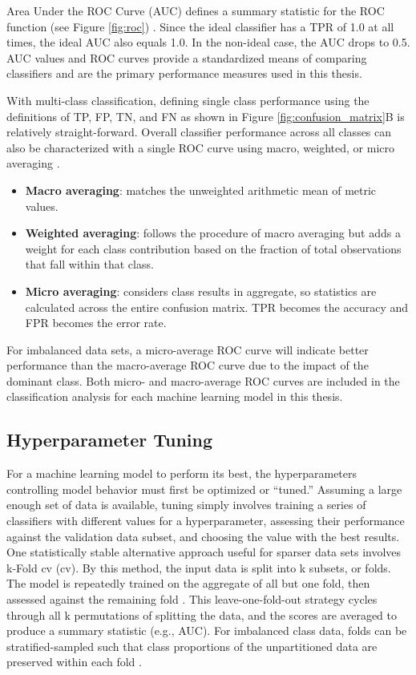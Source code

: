 Area Under the ROC Curve (AUC) defines a summary statistic for the ROC function (see Figure \ref{fig:roc}) \citep{fawcett_introduction_2006}. Since the ideal classifier has a TPR of 1.0 at all times, the ideal AUC also equals 1.0. In the non-ideal case, the AUC drops to 0.5. AUC values and ROC curves provide a standardized means of comparing classifiers and are the primary performance measures used in this thesis.

With multi-class classification, defining single class performance using the definitions of TP, FP, TN, and FN as shown in Figure \ref{fig:confusion_matrix}B is relatively straight-forward. Overall classifier performance across all classes can also be characterized with a single ROC curve using macro, weighted, or micro averaging \citep{scikit-learn_sklearnmetricsroc_auc_score_2021}.

\begin{itemize}[itemsep=2pt]
    \item \textbf{Macro averaging}: matches the unweighted arithmetic mean of metric values.
    \item \textbf{Weighted averaging}: follows the procedure of macro averaging but adds a weight for each class contribution based on the fraction of total observations that fall within that class. 
    \item \textbf{Micro averaging}: considers class results in aggregate, so statistics are calculated across the entire confusion matrix. TPR becomes the accuracy and FPR becomes the error rate.
\end{itemize}

For imbalanced data sets, a micro-average ROC curve will indicate better performance than the macro-average ROC curve due to the impact of the dominant class. Both micro- and macro-average ROC curves are included in the classification analysis for each machine learning model in this thesis.

\subsection{Hyperparameter Tuning}\label{ch3:strat_kfold_cv}
For a machine learning model to perform its best, the hyperparameters controlling model behavior must first be optimized or ``tuned.'' Assuming a large enough set of data is available, tuning simply involves training a series of classifiers with different values for a hyperparameter, assessing their performance against the validation data subset, and choosing the value with the best results. One statistically stable alternative approach useful for sparser data sets involves k-Fold \acrlong{cv} (\acrshort{cv}). By this method, the input data is split into k subsets, or folds. The model is repeatedly trained on the aggregate of all but one fold, then assessed against the remaining fold \citep[p. 181]{james_introduction_2013}. This leave-one-fold-out strategy cycles through all k permutations of splitting the data, and the scores are averaged to produce a summary statistic (e.g., AUC). For imbalanced class data, folds can be stratified-sampled such that class proportions of the unpartitioned data are preserved within each fold \citep{brownlee_how_2020}. 

